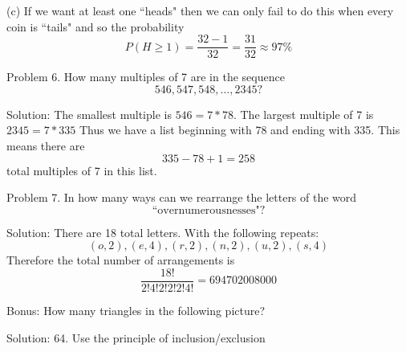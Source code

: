 \documentclass[16 pt]{amsart}
\theoremstyle{definition}
\theoremstyle{remark}
\numberwithin{equation}{subsection}
\begin{document}
(c) If we want at least one ``heads" then we can only fail to do this when every coin is ``tails" and so the probability
\[
P(H\ge 1) = \frac{32-1}{32} = \frac{31}{32} \approx 97\%
\] 

\newpage

Problem 6. How many multiples of 7 are in the sequence
\[
546, 547, 548, \dots, 2345 ?
\]


\vspace{1in}

Solution: The smallest multiple is $546 = 7* 78$.  The largest multiple of 7 is $2345=7*335$
Thus we have a list beginning with 78 and ending with 335.  This means there are
\[
335-78+1 = 258
\]
total multiples of 7 in this list.

\newpage

Problem 7. In how many ways can we rearrange the letters of the word
\[
\text{``overnumerousnesses"}?
\]


\vspace{1in}

Solution: There are 18 total letters.  With the following repeats:
\[
(o,2),(e,4),(r,2),(n,2),(u,2),(s,4)
\]
Therefore the total number of arrangements is
\[
\frac{18!}{2!4!2!2!2!4!} = 694702008000	
\]



\newpage

Bonus:  How many triangles in the following picture?


\begin{center}



\end{center}


\vspace{1in}

Solution: 64. Use the principle of inclusion/exclusion
 
\end{document}
